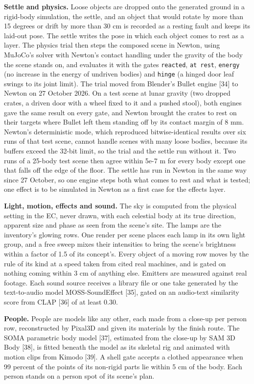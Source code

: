 \documentclass[
  11pt,
]{article}
\begin{document}
\textbf{Settle and physics.} Loose objects are dropped onto the
generated ground in a rigid-body simulation, the settle, and an object
that would rotate by more than 15 degrees or drift by more than 30 cm is
recorded as a resting fault and keeps its laid-out pose. The settle
writes the pose in which each object comes to rest as a layer. The
physics trial then steps the composed scene in Newton, using MuJoCo's
solver with Newton's contact handling under the gravity of the body the
scene stands on, and evaluates it with the gates \texttt{reacted},
\texttt{at\ rest}, \texttt{energy} (no increase in the energy of
undriven bodies) and \texttt{hinge} (a hinged door leaf swings to its
joint limit). The trial moved from Blender's Bullet engine {[}34{]} to
Newton on 27 October 2026. On a test scene at lunar gravity (two dropped
crates, a driven door with a wheel fixed to it and a pushed stool), both
engines gave the same result on every gate, and Newton brought the
crates to rest on their targets where Bullet left them standing off by
its contact margin of 8 mm. Newton's deterministic mode, which
reproduced bitwise-identical results over six runs of that test scene,
cannot handle scenes with many loose bodies, because its buffers exceed
the 32-bit limit, so the trial and the settle run without it. Two runs
of a 25-body test scene then agree within 5e-7 m for every body except
one that falls off the edge of the floor. The settle has run in Newton
in the same way since 27 October, so one engine steps both what comes to
rest and what is tested; one effect is to be simulated in Newton as a
first case for the effects layer.

\textbf{Light, motion, effects and sound.} The sky is computed from the
physical setting in the EC, never drawn, with each celestial body at its
true direction, apparent size and phase as seen from the scene's site.
The lamps are the inventory's glowing rows. One render per scene places
each lamp in its own light group, and a free sweep mixes their
intensities to bring the scene's brightness within a factor of 1.5 of
its concept's. Every object of a moving row moves by the rule of its
kind at a speed taken from cited real machines, and is gated on nothing
coming within 3 cm of anything else. Emitters are measured against real
footage. Each sound source receives a library file or one take generated
by the text-to-audio model MOSS-SoundEffect {[}35{]}, gated on an
audio-text similarity score from CLAP {[}36{]} of at least 0.30.

\textbf{People.} People are models like any other, each made from a
close-up per person row, reconstructed by Pixal3D and given its
materials by the finish route. The SOMA parametric body model {[}37{]},
estimated from the close-up by SAM 3D Body {[}38{]}, is fitted beneath
the model as its skeletal rig and animated with motion clips from Kimodo
{[}39{]}. A shell gate accepts a clothed appearance when 99 percent of
the points of its non-rigid parts lie within 5 cm of the body. Each
person stands on a person spot of its scene's plan.
\end{document}
